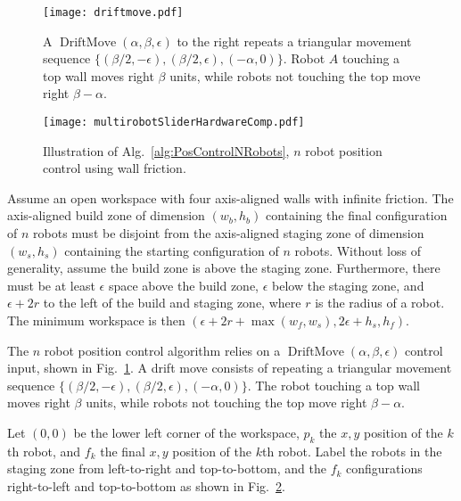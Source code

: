 \begin{figure}
\begin{center}
	\texttt{[image: driftmove.pdf]}
\end{center}
\vspace{-1em}
\caption{\label{fig:driftmove}
A  $\operatorname{DriftMove}(\alpha, \beta, \epsilon)$ to the right repeats a triangular movement sequence $\{ (\beta/2,-\epsilon),(\beta/2,\epsilon),(-\alpha,0)\}$. Robot $A$ touching a top wall moves right $\beta$ units, while robots not touching the top move right $\beta-\alpha$.
}
\end{figure}
\begin{figure}
\begin{center}
	\texttt{[image: multirobotSliderHardwareComp.pdf]}
\end{center}
\vspace{-1em}
\caption{\label{fig:construction2d}
Illustration of Alg.\ \ref{alg:PosControlNRobots}, $n$ robot position control  using wall friction.
}
\end{figure}


Assume an open workspace with four axis-aligned walls with infinite friction.
The axis-aligned build zone of dimension $(w_b, h_b)$ containing the final configuration of $n$ robots must be disjoint from the axis-aligned staging zone of dimension $(w_s, h_s)$  containing the starting configuration of $n$ robots. Without loss of generality, assume the build zone  is above the staging zone. 
Furthermore, there must be at least $\epsilon$ space above the build zone, $\epsilon$ below the staging zone, and $\epsilon + 2r$ to the left of the build and staging zone, where $r$ is the radius of a robot.  The minimum workspace is then $(\epsilon + 2r + \max(w_f,w_s), 2\epsilon + h_s,h_f)$.

The $n$ robot position control algorithm relies on a $\operatorname{DriftMove}(\alpha, \beta, \epsilon)$ control input, shown in Fig.\  \ref{fig:driftmove}.
A drift move consists of repeating a triangular movement sequence $\{ (\beta/2,-\epsilon),(\beta/2,\epsilon),(-\alpha,0)\}$. The robot touching a top wall moves right $\beta$ units, while robots not touching the top move right $\beta-\alpha$.

Let $(0,0)$ be the lower left corner of the workspace, $p_k$ the $x,y$ position of the $k$th robot, and $f_k$ the final $x,y$ position of the $k$th robot. Label the robots in the staging zone from left-to-right and top-to-bottom, and the $f_k$ configurations right-to-left and top-to-bottom as shown in Fig.~\ref{fig:construction2d}.

